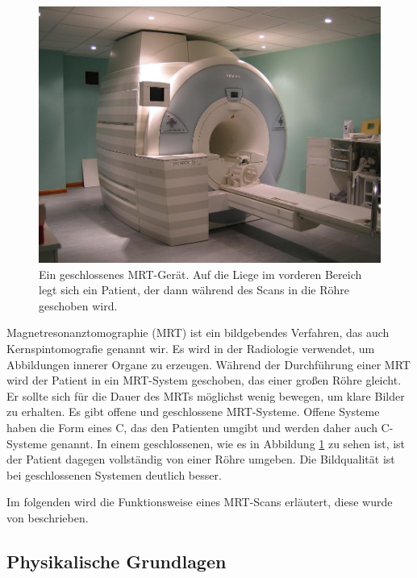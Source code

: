 \begin{figure}[!htb]
	\centering
	\includegraphics[width=0.5\linewidth]{images/mri.jpg}
	\caption{Ein geschlossenes MRT-Gerät. Auf die Liege im vorderen Bereich legt sich ein Patient, der dann während des Scans in die Röhre geschoben wird. }
	\label{img:mri}
\end{figure}
\FloatBarrier

Magnetresonanztomographie (MRT) ist ein bildgebendes Verfahren, das auch Kernspintomografie genannt wir. Es wird in der Radiologie verwendet, um Abbildungen innerer Organe zu erzeugen. Während der Durchführung einer MRT wird der Patient in ein MRT-System geschoben, das einer großen Röhre gleicht. Er sollte sich für die Dauer des MRTs möglichst wenig bewegen, um klare Bilder zu erhalten.
Es gibt offene und geschlossene MRT-Systeme. Offene Systeme haben die Form eines C, das den Patienten umgibt und werden daher auch C-Systeme genannt. In einem geschlossenen, wie es in Abbildung \ref{img:mri} zu sehen ist, ist der Patient dagegen vollständig von einer Röhre umgeben. Die Bildqualität ist bei geschlossenen Systemen deutlich besser.

Im folgenden wird die Funktionsweise eines MRT-Scans erläutert, diese wurde von \cite{weishaupt09} beschrieben.

\subsection{Physikalische Grundlagen}

